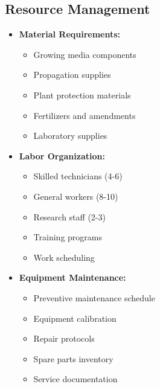 \subsection{Resource Management}
\begin{itemize}
    \item \textbf{Material Requirements:}
    \begin{itemize}
        \item Growing media components
        \item Propagation supplies
        \item Plant protection materials
        \item Fertilizers and amendments
        \item Laboratory supplies
    \end{itemize}
    
    \item \textbf{Labor Organization:}
    \begin{itemize}
        \item Skilled technicians (4-6)
        \item General workers (8-10)
        \item Research staff (2-3)
        \item Training programs
        \item Work scheduling
    \end{itemize}
    
    \item \textbf{Equipment Maintenance:}
    \begin{itemize}
        \item Preventive maintenance schedule
        \item Equipment calibration
        \item Repair protocols
        \item Spare parts inventory
        \item Service documentation
    \end{itemize}
\end{itemize}

